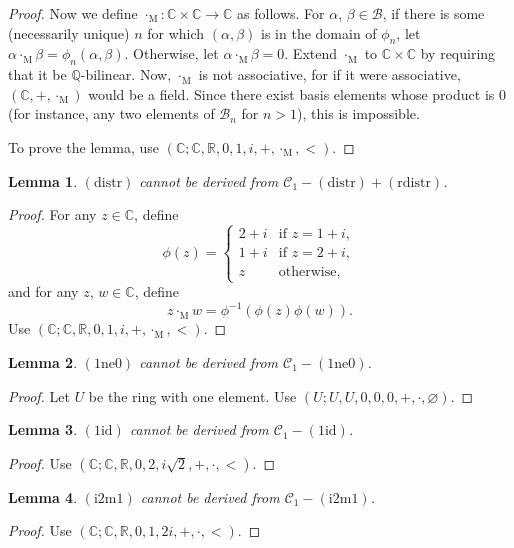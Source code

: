 \documentclass{article}
\newcommand\bC{\mathbb{C}}
\newcommand\bR{\mathbb{R}}
\newcommand\bQ{\mathbb{Q}}
\newcommand\cB{\mathcal{B}}
\newcommand\cC{\mathcal{C}}
\newcommand\rM{\mathrm{M}}
\newtheorem{lemma}{Lemma}[section]
\begin{document}
\begin{proof}
Now we define $\cdot_\rM : \bC \times \bC \longrightarrow \bC$ as follows. For $\alpha$, $\beta \in \cB$, if there is some (necessarily unique) $n$ for which $(\alpha, \beta)$ is in the domain of $\phi_n$, let $\alpha \cdot_\rM \beta = \phi_n(\alpha, \beta)$. Otherwise, let $\alpha \cdot_\rM \beta = 0$. Extend $\cdot_\rM$ to $\bC \times \bC$ by requiring that it be $\bQ$-bilinear. Now, $\cdot_\rM$ is not associative, for if it were associative, $(\bC, +, \cdot_\rM)$ would be a field. Since there exist basis elements whose product is 0 (for instance, any two elements of $\cB_n$ for $n > 1$), this is impossible.

To prove the lemma, use $(\bC; \bC, \bR, 0, 1, i, +, \cdot_\rM, <)$.
\end{proof}

\begin{lemma}
$\mathrm{(distr)}$ cannot be derived from $\cC_1 - \mathrm{(distr)} + \mathrm{(rdistr)}$.
\end{lemma}
\begin{proof}
For any $z \in \bC$, define
\[ \phi(z) =
\begin{cases}
2 + i & \text{if $z = 1 + i$}, \\
1 + i & \text{if $z = 2 + i$}, \\
z     & \text{otherwise,}
\end{cases}
\]
and for any $z$, $w \in \bC$, define
\[ z \cdot_\rM w = \phi^{-1}(\phi(z)\phi(w)). \]
Use $(\bC; \bC, \bR, 0, 1, i, +, \cdot_\rM, <)$.
\end{proof}

\begin{lemma}
$\mathrm{(1ne0)}$ cannot be derived from $\cC_1 - \mathrm{(1ne0)}$.
\end{lemma}
\begin{proof}
Let $U$ be the ring with one element.
Use $(U; U, U, 0, 0, 0, +, \cdot, \varnothing)$.
\end{proof}

\begin{lemma}
$\mathrm{(1id)}$ cannot be derived from $\cC_1 - \mathrm{(1id)}$.
\end{lemma}
\begin{proof}
Use $(\bC; \bC, \bR, 0, 2, i\sqrt{2}, +, \cdot, <)$.
\end{proof}

\begin{lemma}
$\mathrm{(i2m1)}$ cannot be derived from $\cC_1 - \mathrm{(i2m1)}$.
\end{lemma}
\begin{proof}
Use $(\bC; \bC, \bR, 0, 1, 2i, +, \cdot, <)$.
\end{proof}
\end{document}
